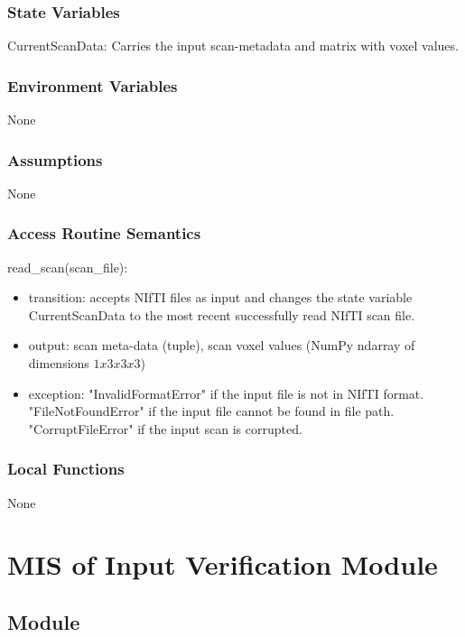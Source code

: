\documentclass[12pt, titlepage]{article}
\begin{document}
\subsubsection{State Variables}

CurrentScanData: Carries the input scan-metadata and matrix with voxel values.

\subsubsection{Environment Variables}
None

\subsubsection{Assumptions}
None
\subsubsection{Access Routine Semantics}

\noindent read\_scan(scan\_file):
\begin{itemize}
  \item transition: accepts NIfTI files as input and changes the state variable
        CurrentScanData to the most recent successfully read NIfTI scan file.
  \item output: scan meta-data (tuple), scan voxel values (NumPy ndarray of dimensions $1x3x3x3$)
  \item exception: "InvalidFormatError" if the input file is not in NIfTI format. "FileNotFoundError" if the input file cannot be found in file path.
        "CorruptFileError" if the input scan is corrupted.
\end{itemize}



\subsubsection{Local Functions}

None

\newpage

\section{MIS of Input Verification Module} \label{IV}


\subsection{Module}
\end{document}
